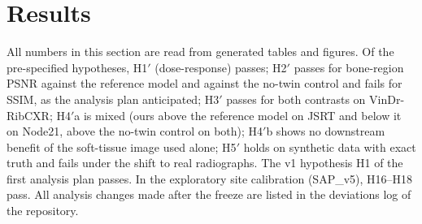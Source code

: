 \section{Results}
\label{sec:results}
All numbers in this section are read from generated tables and figures. Of the pre-specified hypotheses, H1$'$ (dose-response) passes;
H2$'$ passes for bone-region PSNR against the reference model and against the no-twin control and fails for SSIM, as the analysis plan
anticipated; H3$'$ passes for both contrasts on VinDr-RibCXR; H4$'$a is mixed (ours above the reference model on JSRT and below it on Node21,
above the no-twin control on both); H4$'$b shows no downstream benefit of the soft-tissue image used alone; H5$'$ holds on synthetic data with
exact truth and fails under the shift to real radiographs. The v1 hypothesis H1 of the first analysis plan passes. In the exploratory site
calibration (SAP\_v5), H16--H18 pass. All analysis changes made after the freeze are listed in the deviations log of the repository.

